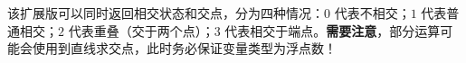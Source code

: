 该扩展版可以同时返回相交状态和交点，分为四种情况：$0$ 代表不相交；$1$ 代表普通相交；$2$ 代表重叠（交于两个点）；$3$ 代表相交于端点。\textbf{需要注意}，部分运算可能会使用到直线求交点，此时务必保证变量类型为浮点数！